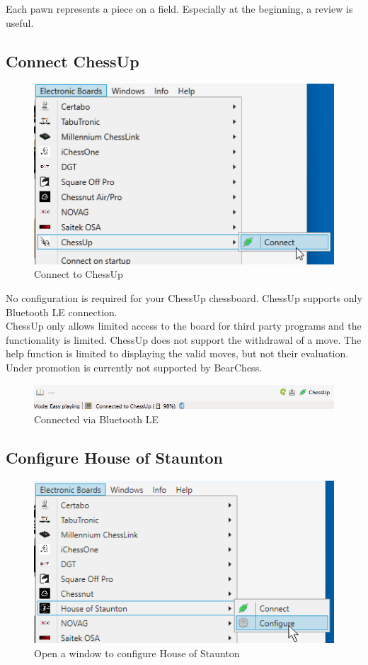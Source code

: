 \documentclass[11pt,a4paper]{article}
\begin{document}
Each pawn represents a piece on a field. Especially at the beginning, a review is useful. 

\subsection{Connect ChessUp} \label{ConnectChessUp}
\begin{figure}[H]
	\centering
	\includegraphics[scale=1.0]{ChessUp1.png}
	\caption{Connect to ChessUp }
	\label{fig:ChessUp1}
\end{figure}

No configuration is required for your ChessUp chessboard. ChessUp supports only Bluetooth LE connection.\\ 
ChessUp only allows limited access to the board for third party programs and the functionality is limited. ChessUp does not support the withdrawal of a move. The help function is limited to displaying the valid moves, but not their evaluation. Under promotion is currently not supported by BearChess.\\

\begin{figure}[H]
	\centering
	\includegraphics[scale=0.7]{ChessUp2.png}
	\caption{Connected via Bluetooth LE}
	\label{fig:ChessUp2}
\end{figure}


\subsection{Configure House of Staunton} \label{ConnectHOS}
\begin{figure}[H]
	\centering
	\includegraphics[scale=1.0]{HOS1.png}
	\caption{Open a window to configure House of Staunton}
	\label{fig:HOS1}
\end{figure}
\end{document}
